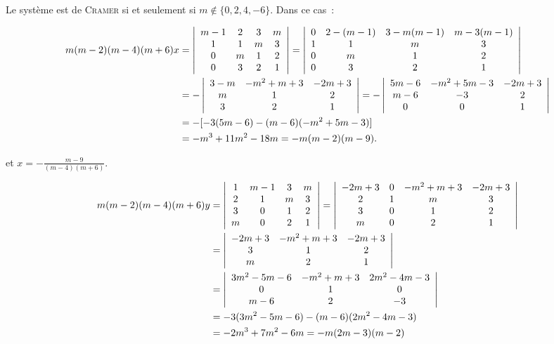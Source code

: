 {{\begin{enumerate}
Le système est de \textsc{Cramer} si et seulement si $m\notin\{0,2,4,-6\}$. Dans ce cas~:

\begin{align*}\ensuremath
m(m-2)(m-4)(m+6)x&=\left|
\begin{array}{cccc}
m-1&2&3&m\\
1&1&m&3\\
0&m&1&2\\
0&3&2&1
\end{array}\right|=\left|
\begin{array}{cccc}
0&2-(m-1)&3-m(m-1)&m-3(m-1)\\
1&1&m&3\\
0&m&1&2\\
0&3&2&1
\end{array}\right|\\
 &=-\left|
\begin{array}{ccc}
3-m&-m^2+m+3&-2m+3\\
m&1&2\\
3&2&1
\end{array}\right|=-\left|
\begin{array}{ccc}
5m-6&-m^2+5m-3&-2m+3\\
m-6&-3&2\\
0&0&1
\end{array}\right|\\
 &=-[-3(5m-6)-(m-6)(-m^2+5m-3)]\\
 &=-m^3+11m^2-18m=-m(m-2)(m-9).
\end{align*}

et $x=-\frac{m-9}{(m-4)(m+6)}$.

\begin{align*}\ensuremath
m(m-2)(m-4)(m+6)y&=\left|
\begin{array}{cccc}
1&m-1&3&m\\
2&1&m&3\\
3&0&1&2\\
m&0&2&1
\end{array}\right|=\left|
\begin{array}{cccc}
-2m+3&0&-m^2+m+3&-2m+3\\
2&1&m&3\\
3&0&1&2\\
m&0&2&1
\end{array}\right|\\
 &=\left|
\begin{array}{ccc}
-2m+3&-m^2+m+3&-2m+3\\
3&1&2\\
m&2&1
\end{array}\right|\\
 &=\left|
\begin{array}{ccc}
3m^2-5m-6&-m^2+m+3&2m^2-4m-3\\
0&1&0\\
m-6&2&-3
\end{array}\right|\\
 &=-3(3m^2-5m-6)-(m-6)(2m^2-4m-3)\\
 &=-2m^3+7m^2-6m=-m(2m-3)(m-2)
\end{align*}


\end{enumerate}}}
